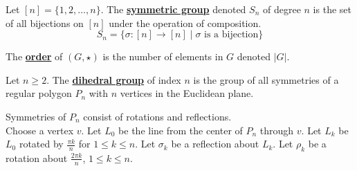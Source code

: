 \documentclass[11pt,letterpaper,boxed]{hmcpset}
\newcommand{\define}[1]{\underline{\textbf{#1}}}
\theoremstyle{definition}
\begin{document}
\begin{defi}
    Let $[n]=\{1,2,\ldots,n\}$. The \define{symmetric group} denoted $S_n$ of degree $n$ is the set of all bijections on $[n]$ under the operation of composition.
    $$S_n=\{\sigma:[n]\rightarrow[n]\mid\sigma\text{ is a bijection}\}$$
\end{defi}

\begin{defi}
    The \define{order} of $(G,\star)$ is the number of elements in $G$ denoted $|G|$.
\end{defi}

\begin{defi}
    Let $n\ge 2$. The \define{dihedral group} of index $n$ is the group of all symmetries of a regular polygon $P_n$ with $n$ vertices in the Euclidean plane.
\end{defi}

Symmetries of $P_n$ consist of rotations and reflections.\\

Choose a vertex $v$. Let $L_0$ be the line from the center of $P_n$ through $v$. Let $L_k$ be $L_0$ rotated by $\frac{\pi k}{n}$ for $1\le k\le n$. Let $\sigma_k$ be a reflection about $L_k$. Let $\rho_k$ be a rotation about $\frac{2\pi k}{n}$, $1\le k\le n$.
\end{document}
